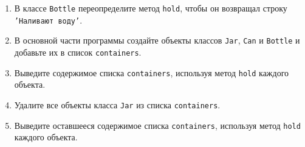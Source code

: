 \begin{enumerate}
\begin{enumerate}
    \item В классе \texttt{Bottle} переопределите метод \texttt{hold}, чтобы он возвращал строку \texttt{'Наливают воду'}.
    \item В основной части программы создайте объекты классов \texttt{Jar}, \texttt{Can} и \texttt{Bottle} и добавьте их в список \texttt{containers}.
    \item Выведите содержимое списка \texttt{containers}, используя метод \texttt{hold} каждого объекта.
    \item Удалите все объекты класса \texttt{Jar} из списка \texttt{containers}.
    \item Выведите оставшееся содержимое списка \texttt{containers}, используя метод \texttt{hold} каждого объекта.
\end{enumerate}
\end{enumerate}


